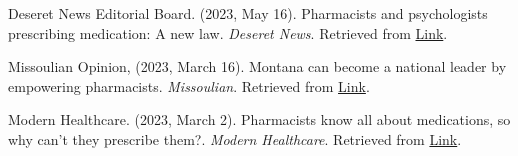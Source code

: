 \begin{etaremune}
\item Deseret News Editorial Board. (2023, May 16). Pharmacists and psychologists prescribing medication: A new law. \textit{Deseret News}. Retrieved from \hfill \href{https://www.deseret.com/opinion/2023/5/16/23721625/pharmacists-psychologists-prescribe-medication-law}{Link}.

\item Missoulian Opinion, (2023, March 16). Montana can become a national leader by empowering pharmacists. \textit{Missoulian}. Retrieved from \hfill \href{https://missoulian.com/opinion/column/alicia-plemmons-montana-can-become-a-national-leader-by-empowering-pharmacists/article_2195cdb4-bdec-11ed-bb42-4b2d76a0b8cf.html}{Link}.

\item Modern Healthcare. (2023, March 2). Pharmacists know all about medications, so why can’t they prescribe them?. \textit{Modern Healthcare}. Retrieved from \hfill \href{https://www.modernhealthcare.com/opinion/pharmacists-prescribing-authority-alicia-plemmons-west-virginia-university}{Link}.
\end{etaremune}


